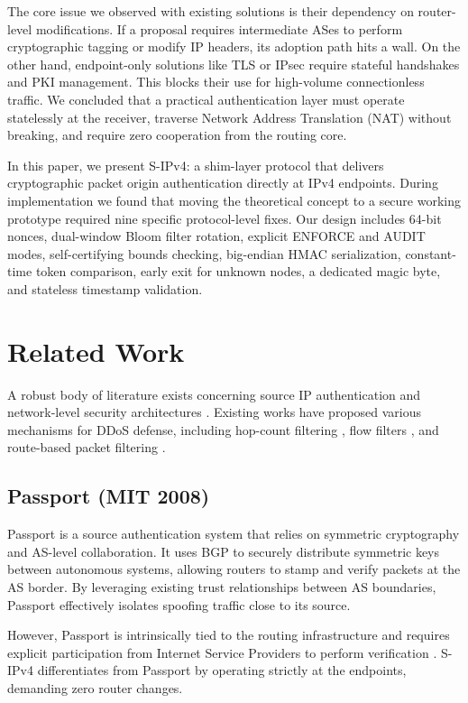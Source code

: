 \documentclass[journal]{IEEEtran}
\begin{document}
The core issue we observed with existing solutions is their dependency on router-level modifications. If a proposal requires intermediate ASes to perform cryptographic tagging or modify IP headers, its adoption path hits a wall. On the other hand, endpoint-only solutions like TLS or IPsec require stateful handshakes and PKI management. This blocks their use for high-volume connectionless traffic. We concluded that a practical authentication layer must operate statelessly at the receiver, traverse Network Address Translation (NAT) without breaking, and require zero cooperation from the routing core.

In this paper, we present S-IPv4: a shim-layer protocol that delivers cryptographic packet origin authentication directly at IPv4 endpoints. During implementation we found that moving the theoretical concept to a secure working prototype required nine specific protocol-level fixes. Our design includes 64-bit nonces, dual-window Bloom filter rotation, explicit ENFORCE and AUDIT modes, self-certifying bounds checking, big-endian HMAC serialization, constant-time token comparison, early exit for unknown nodes, a dedicated magic byte, and stateless timestamp validation.

\section{Related Work}
\label{sec:related}
A robust body of literature exists concerning source IP authentication and network-level security architectures \cite{peng2007survey, douligeris2004ddos}. Existing works have proposed various mechanisms for DDoS defense, including hop-count filtering \cite{jin2003hop}, flow filters \cite{yaar2004siff}, and route-based packet filtering \cite{park2001route}.

\subsection{Passport (MIT 2008)}
Passport is a source authentication system that relies on symmetric cryptography and AS-level collaboration. It uses BGP to securely distribute symmetric keys between autonomous systems, allowing routers to stamp and verify packets at the AS border. By leveraging existing trust relationships between AS boundaries, Passport effectively isolates spoofing traffic close to its source. 

However, Passport is intrinsically tied to the routing infrastructure and requires explicit participation from Internet Service Providers to perform verification \cite{andersen2008accountable}. S-IPv4 differentiates from Passport by operating strictly at the endpoints, demanding zero router changes.
\end{document}
